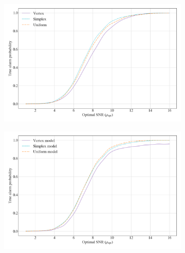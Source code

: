 \documentclass[12pt]{iopart}
\begin{document}
\begin{figure}[t!]
\medskip
\begin{subfigure}{0.48\textwidth}
\includegraphics[width=\linewidth]{figures/simplex_trained.png}
\caption{}\label{fig:c}
\end{subfigure}\hspace*{\fill}
\begin{subfigure}{0.48\textwidth}
\includegraphics[width=\linewidth]{figures/efficiency_curve_stest.png}
\caption{}\label{fig:d}
\end{subfigure}


\end{figure}
\end{document}
